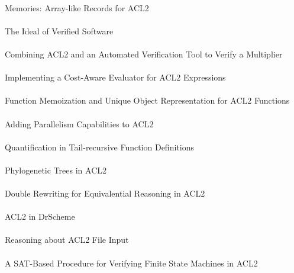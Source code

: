 \documentclass{article}
\begin{document}
\cite{06-davis-memories} \\
Memories: Array-like Records for {ACL2} \\

\cite{06-hoare-ideal} \\
The Ideal of Verified Software \\

\cite{06-reeber-multiplier} \\
Combining {ACL2} and an Automated Verification Tool to Verify a Multiplier \\

\cite{06-gamboa-evaluator} \\
Implementing a Cost-Aware Evaluator for {ACL2} Expressions \\

\cite{06-boyer-memoization} \\
Function Memoization and Unique Object Representation for {ACL2} Functions \\

\cite{06-rager-parallelism} \\
Adding Parallelism Capabilities to {ACL2} \\

\cite{06-ray-quantification} \\
Quantification in Tail-recursive Function Definitions \\

\cite{06-hunt-phylogenetic} \\
Phylogenetic Trees in {ACL2} \\

\cite{06-kaufmann-double} \\
Double Rewriting for Equivalential Reasoning in {ACL2} \\

\cite{06-vaillancourt-drscheme} \\
{ACL2} in {DrScheme} \\

\cite{06-davis-file} \\
Reasoning about {ACL2} File Input \\

\cite{06-reeber-sat} \\
A {SAT}-Based Procedure for Verifying Finite State Machines in {ACL2} \\
\end{document}
